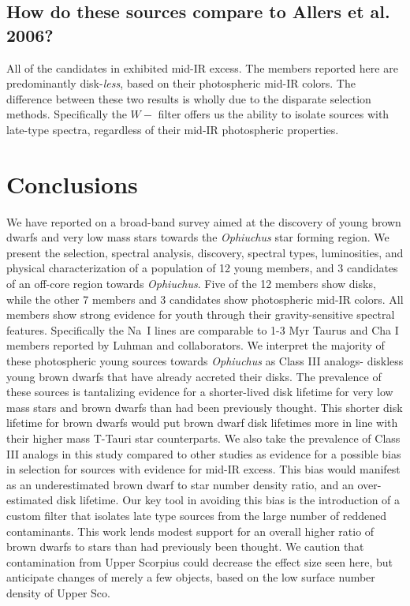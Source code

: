 \documentclass[12pt,preprint]{aastex}
\begin{document}
\subsection{How do these sources compare to Allers et al. 2006?}
All of the candidates in \citet{allers06} exhibited mid-IR excess.  The members reported here are predominantly disk-\emph{less}, based on their photospheric mid-IR colors.  The difference between these two results is wholly due to the disparate selection methods.  Specifically the $W-$ filter offers us the ability to isolate sources with late-type spectra, regardless of their mid-IR photospheric properties.  


\section{Conclusions}

We have reported on a broad-band survey aimed at the discovery of young brown dwarfs and very low mass stars towards the \emph{Ophiuchus} star forming region.  We present the selection, spectral analysis, discovery, spectral types, luminosities, and physical characterization of a population of 12 young members, and 3 candidates of an off-core region towards \emph{Ophiuchus}.  Five of the 12 members show disks, while the other 7 members and 3 candidates show photospheric mid-IR colors.  All members show strong evidence for youth through their gravity-sensitive spectral features.  Specifically the Na~I lines are comparable to 1-3 Myr Taurus and Cha I members reported by Luhman and collaborators.  We interpret the majority of these photospheric young sources towards \emph{Ophiuchus} as Class III analogs- diskless young brown dwarfs that have already accreted their disks.  The prevalence of these sources is tantalizing evidence for a shorter-lived disk lifetime for very low mass stars and brown dwarfs than had been previously thought.  This shorter disk lifetime for brown dwarfs would put brown dwarf disk lifetimes more in line with their higher mass T-Tauri star counterparts.  We also take the prevalence of Class III analogs in this study compared to other studies as evidence for a possible bias in selection for sources with evidence for mid-IR excess.  This bias would manifest as an underestimated brown dwarf to star number density ratio, and an over-estimated disk lifetime.  Our key tool in avoiding this bias is the introduction of a custom filter that isolates late type sources from the large number of reddened contaminants.  This work lends modest support for an overall higher ratio of brown dwarfs to stars than had previously been thought.  We caution that contamination from Upper Scorpius could decrease the effect size seen here, but anticipate changes of merely a few objects, based on the low surface number density of Upper Sco.
\end{document}
